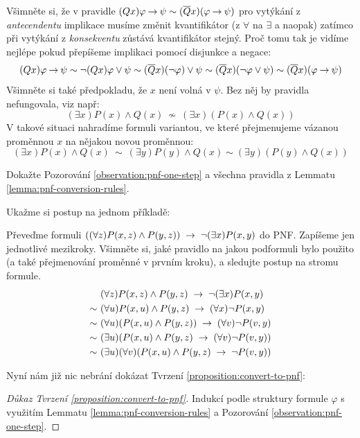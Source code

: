 Všimněte si, že v pravidle $(Qx)\varphi \mathbin{\rightarrow} \psi\sim(\overline{Q}x)(\varphi \mathbin{\rightarrow} \psi)$ pro vytýkání z \emph{antecendentu} implikace musíme změnit kvantifikátor (z $\forall$ na $\exists$ a naopak) zatímco při vytýkání z \emph{konsekventu} zůstává kvantifikátor stejný. Proč tomu tak je vidíme nejlépe pokud přepíšeme implikaci pomocí disjunkce a negace:
$$
(Qx)\varphi \mathbin{\rightarrow} \psi\sim\neg(Qx)\varphi \lor\psi\sim(\overline{Q}x)(\neg\varphi)\lor\psi\sim(\overline{Q}x)(\neg\varphi\lor\psi)\sim (\overline{Q}x)(\varphi \mathbin{\rightarrow} \psi)
$$
Všimněte si také předpokladu, že $x$ není volná v $\psi$. Bez něj by pravidla nefungovala, viz např:
$$
(\exists x)P(x)\land Q(x)\ \not\sim\ (\exists x)(P(x)\land Q(x))
$$
V takové situaci nahradíme formuli variantou, ve které přejmenujeme vázanou proměnnou $x$ na nějakou novou proměnnou: 
$$
(\exists x)P(x)\land Q(x)\ \sim\ (\exists y)P(y)\land Q(x) \sim (\exists y)(P(y)\land Q(x))
$$
\begin{exercise}
    Dokažte Pozorování \ref{observation:pnf-one-step} a všechna pravidla z Lemmatu \ref{lemma:pnf-conversion-rules}.
\end{exercise}

Ukažme si postup na jednom příkladě:

\begin{example}\label{example:convert-to-pnf}
    Převeďme formuli $((\forall z)P(x,z)\land P(y,z))\ \limplies\ \neg(\exists x)P(x,y)$ do PNF. Zapíšeme jen jednotlivé mezikroky. Všimněte si, jaké pravidlo na jakou podformuli bylo použito (a také přejmenování proměnné v prvním kroku), a sledujte postup na stromu formule.
    \begin{align*}
        &\ (\forall z)P(x,z)\land P(y,z)\ \limplies\ \neg(\exists x)P(x,y)\\ \sim &\ 
        (\forall u) P(x,u)\land P(y,z)\ \limplies\ (\forall x)\neg P(x,y)\\ \sim &\ 
        (\forall u)(P(x,u)\land P(y,z))\ \limplies\ (\forall v)\neg P(v,y)\\ \sim &\ 
        (\exists u)( P(x,u)\land P(y,z)\ \limplies\ (\forall v)\neg P(v,y))\\ \sim &\ 
        (\exists u)(\forall v)( P(x,u)\land P(y,z)\ \limplies\ \neg P(v,y))
        \end{align*}    
\end{example}

Nyní nám již nic nebrání dokázat Tvrzení \ref{proposition:convert-to-pnf}:

\begin{proof}[Důkaz Tvrzení \ref{proposition:convert-to-pnf}]
    Indukcí podle struktury formule $\varphi$ s využitím Lemmatu \ref{lemma:pnf-conversion-rules} a Pozorování \ref{observation:pnf-one-step}.
\end{proof}

